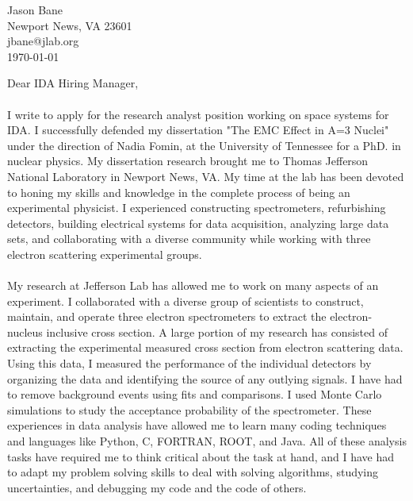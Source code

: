 \documentclass[12pt,letterpaper]{article}
\newcommand{\CPP}
{C\nolinebreak[4]\hspace{-.05em}\raisebox{.22ex}{\footnotesize\bf ++}}
\begin{document}
\vspace*{-1.2cm}
\noindent Jason Bane\\
Newport News, VA 23601 \\
jbane@jlab.org \\

\noindent\today\\

\noindent 

Dear IDA Hiring Manager,

\paragraph{}I write to apply for the research analyst position working on space systems for IDA. I successfully defended my dissertation "The EMC Effect in A=3 Nuclei" under the direction of Nadia Fomin, at the University of Tennessee for a PhD. in nuclear physics. My dissertation research brought me to Thomas Jefferson National Laboratory in Newport News, VA. My time at the lab has been devoted to honing my skills and knowledge in the complete process of being an experimental physicist. I experienced constructing spectrometers, refurbishing detectors, building electrical systems for data acquisition, analyzing large data sets, and collaborating with a diverse community while working with three electron scattering experimental groups.

\paragraph{}My research at Jefferson Lab has allowed me to work on many aspects of an experiment. I collaborated with a diverse group of scientists to construct, maintain, and operate three electron spectrometers to extract the electron-nucleus inclusive cross section. A large portion of my research has consisted of extracting the experimental measured cross section from electron scattering data. Using this data, I measured the performance of the individual detectors by organizing the data and identifying the source of any outlying signals. I have had to remove background events using fits and comparisons. I used Monte Carlo simulations to study the acceptance probability of the spectrometer. These experiences in data analysis have allowed me to learn many coding techniques and languages like Python, \CPP, FORTRAN, ROOT, and Java. All of these analysis tasks have required me to think critical about the task at hand, and I have had to adapt my problem solving skills to deal with solving algorithms, studying uncertainties, and debugging my code and the code of others. 
\end{document}
